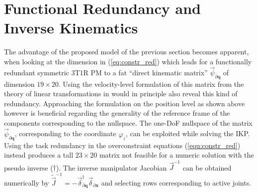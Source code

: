 \documentclass[
	graybox,
	vecphys] %
	{svmult}
\newcommand{\bm}[1]{\boldsymbol{#1}}
\newcommand{\Res}[0]{\vec{\delta}}
\newcommand{\vecResR}[0]{\vec{\psi}}
\begin{document}
%



\section{Functional Redundancy and Inverse Kinematics}
\label{sec:taskred}

The advantage of the proposed model of the previous section becomes apparent, when looking at the dimension in (\ref{eq:constr_red}) which leads for a functionally redundant symmetric 3T1R PM to a fat ``direct kinematic matrix'' \cite{Gogu2008} $\vecResR_{\partial \bm{q}}$ of dimension $19 {\times} 20$.
Using the velocity-level formulation of this matrix from the theory of linear transformations in \cite{Gogu2008} would in principle also reveal this kind of redundancy.
Approaching the formulation on the position level as shown above however is beneficial regarding the generality of the reference frame of the components corresponding to the nullspace.
The one-DoF nullspace of the matrix $\vecResR_{\partial \bm{q}}$, corresponding to  %
the coordinate $\varphi_z$, can be exploited while solving the IKP.
Using the task redundancy in the overconstraint equations (\ref{equ:constr_red}) instead produces a tall $23 {\times} 20$ matrix not feasible for a numeric solution with the pseudo inverse ($\dagger$).
The inverse manipulator Jacobian $\vec{J}^{-1}$ can be obtained numerically by $\tilde{\vec{J}}^{-1}{=}{-} \Res_{\partial \bm{q}}^{\dagger} \Res_{\partial \bm{x}}$  and selecting rows corresponding to active joints. %
\end{document}
